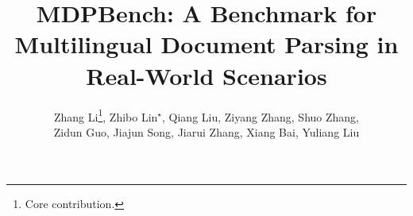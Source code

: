 \documentclass[runningheads]{llncs}
\begin{document}
\title{MDPBench: A Benchmark for Multilingual Document Parsing in Real-World Scenarios} 


\author{Zhang Li\thanks{Core contribution.}, Zhibo Lin$^\star$, Qiang Liu, Ziyang Zhang, Shuo Zhang,\\Zidun Guo, Jiajun Song, Jiarui Zhang, Xiang Bai, Yuliang Liu}




\maketitle
\end{document}
